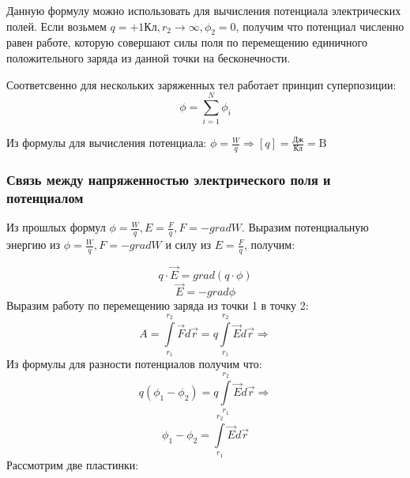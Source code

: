 \documentclass[../main.tex]{subfiles}
\begin{document}
Данную формулу можно использовать для вычисления потенциала электрических полей. Если возьмем $q = +1 Кл, r_2 \to \infty, \phi_2 = 0$, получим что
потенциал численно равен работе, которую совершают силы поля по перемещению единичного положительного заряда из данной точки на бесконечности.

Соответсвенно для нескольких заряженных тел работает принцип суперпозиции:
\[\phi = \sum_{i=1}^{N} \phi_i \]

Из формулы для вычисления потенциала: $\phi = \frac{W}{q} \Rightarrow [q] = \frac{\text{Дж}}{\text{Кл}} = \text{B}$

\subsubsection{Связь между напряженностью электрического поля и потенциалом}

Из прошлых формул $\phi = \frac{W}{q} , E = \frac{F}{q} , F = -grad W$. Выразим потенциальную энергию из $\phi = \frac{W}{q} , F = -grad W$ и силу из $E = \frac{F}{q}$, получим:

\[ q \cdot \vec E = grad(q \cdot \phi)\]
\[ \vec E = -grad \phi\]
Выразим работу по перемещению заряда из точки 1 в точку 2:
\[ A = \int\limits_{r_1}^{r_2} \vec F d \vec r = q \int\limits_{r_1}^{r_2} \vec E d \vec r \Rightarrow \]
Из формулы для разности потенциалов получим что:
\[q(\phi_1 - \phi_2) = q \int\limits_{r_1}^{r_2} \vec E d \vec r \Rightarrow\]
\[\phi_1 - \phi_2 = \int\limits_{r_1}^{r_2} \vec E d \vec r\]
Рассмотрим две пластинки:

\begin{center}
\end{center}
\end{document}
